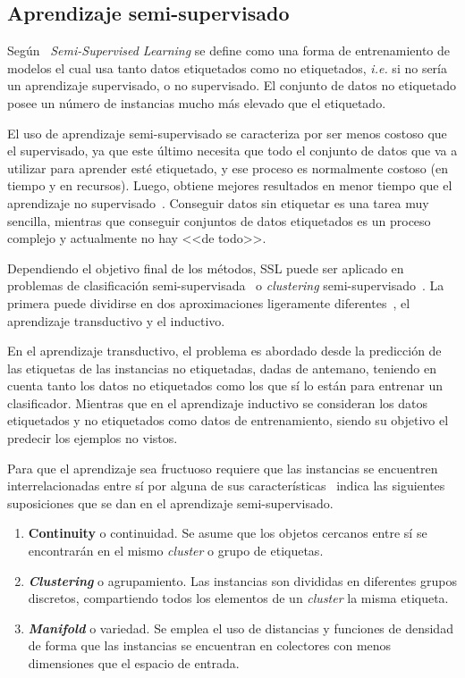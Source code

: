 \subsection{Aprendizaje semi-supervisado}\label{subsec:Aprendizaje-Semi-Supervisado}
Según~\cite{zhou2014semi} \textit{Semi-Supervised Learning} se define como una forma de entrenamiento de modelos el cual usa tanto datos etiquetados como no etiquetados, \textit{i.e.} si no sería un aprendizaje supervisado, o no supervisado. El conjunto de datos no etiquetado posee un número de instancias mucho más elevado que el etiquetado.

El uso de aprendizaje semi-supervisado se caracteriza por ser menos costoso que el supervisado, ya que este último necesita que todo el conjunto de datos que va a utilizar para aprender esté etiquetado, y ese proceso es normalmente costoso (en tiempo y en recursos). Luego, obtiene mejores resultados en menor tiempo que el aprendizaje no supervisado~\cite{van2020survey}. 
Conseguir datos sin etiquetar es una tarea muy sencilla, mientras que conseguir conjuntos de datos etiquetados es un proceso complejo y actualmente no hay <<de todo>>.

Dependiendo el objetivo final de los métodos, SSL puede ser aplicado en problemas de clasificación semi-supervisada~\cite{chapelle2009semi} o \textit{clustering} semi-supervisado~\cite{pedrycz1985algorithms}. La primera puede dividirse en dos aproximaciones ligeramente diferentes~\cite{chen2010semi}, el aprendizaje transductivo y el inductivo. 

En el aprendizaje transductivo, el problema es abordado desde la predicción de las etiquetas de las instancias no etiquetadas, dadas de antemano, teniendo en cuenta tanto los datos no etiquetados como los que sí lo están para entrenar un clasificador. Mientras que en el aprendizaje inductivo se consideran los datos etiquetados y no etiquetados como datos de entrenamiento, siendo su objetivo el predecir los ejemplos no vistos.

Para que el aprendizaje sea fructuoso requiere que las instancias se encuentren interrelacionadas entre sí por alguna de sus características~\cite{javatpoint_semisupervised} indica las siguientes suposiciones que se dan en el aprendizaje semi-supervisado.
\begin{enumerate}
	\item \textbf{Continuity} o continuidad. Se asume que los objetos cercanos entre sí se encontrarán en el mismo \textit{cluster} o grupo de etiquetas. 
	\item \textbf{\textit{Clustering}} o agrupamiento. Las instancias son divididas en diferentes grupos discretos, compartiendo todos los elementos de un \textit{cluster} la misma etiqueta.
	\item \textbf{\textit{Manifold}} o variedad. Se emplea el uso de distancias y funciones de densidad de forma que las instancias se encuentran en colectores con menos dimensiones que el espacio de entrada.
\end{enumerate}

